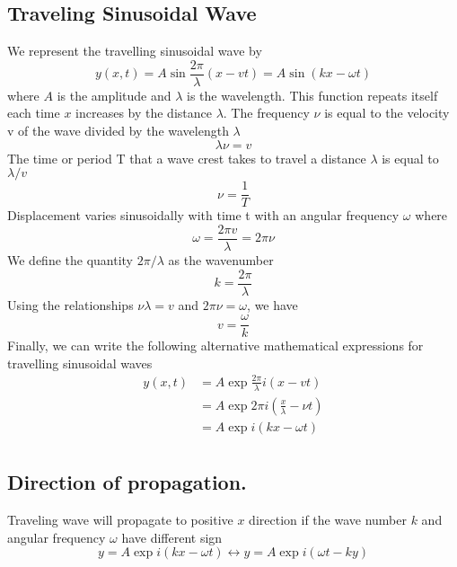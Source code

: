 \documentclass[../../../main.tex]{subfiles}
\begin{document}
\subsection{Traveling Sinusoidal Wave}
We represent the travelling sinusoidal wave by
\begin{equation*}
    y(x, t) = A\sin \frac{2\pi  }{\lambda} (x-vt)=A \sin(kx - \omega t)
\end{equation*}
where $A$ is the amplitude and $\lambda$ is the wavelength. This function repeats itself each time $x$ increases by the distance $\lambda$. The frequency $\nu$ is equal to the velocity v of the
wave divided by the wavelength $\lambda$
\begin{equation*}
    \lambda \nu = v 
\end{equation*}
The time or period T that a wave crest takes to travel a distance $\lambda$ is equal to $\lambda/v$
\begin{equation*}
    \nu=\frac{1}{T}
\end{equation*}
Displacement varies sinusoidally with time t with an angular frequency $\omega$ where
\begin{equation*}
    \omega=\frac{2\pi v}{\lambda}=2\pi \nu
\end{equation*}
We define the quantity $2\pi/\lambda$ as the wavenumber
\begin{equation*}
    k=\frac{2\pi}{\lambda}
\end{equation*}
Using the relationships $\nu\lambda = v$ and $2\pi\nu = \omega$, we have
\begin{equation*}
    v=\frac{\omega}{k}
\end{equation*}
Finally, we can write the following alternative mathematical expressions for travelling sinusoidal waves
\begin{align*}
    y(x,t)&=A\exp \frac{2\pi  }{\lambda}i (x-vt)\\
    &=A\exp 2\pi i (\frac{x}{\lambda}-\nu t)\\
    &=A\exp i (kx-\omega t)\\
\end{align*}

\subsection{Direction of propagation.} Traveling wave will propagate to positive $x$ direction if the wave number $k$ and angular frequency $\omega$ have different sign
\begin{equation*}
    y=A\exp i (kx-\omega t)\longleftrightarrow y=A\exp i (\omega t-ky)
\end{equation*}
\end{document}
